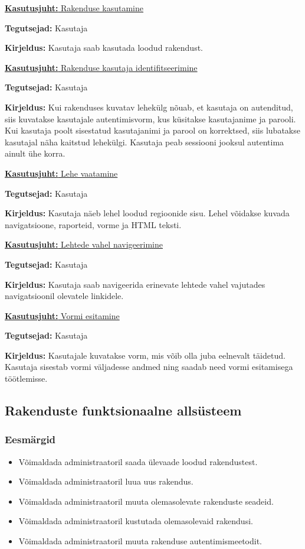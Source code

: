 \documentclass[a4paper,12pt]{article} %
\begin{document}
\underline{\textbf{Kasutusjuht:} Rakenduse kasutamine}
\par
\textbf{Tegutsejad:} Kasutaja
\par
\textbf{Kirjeldus:} Kasutaja saab kasutada loodud rakendust.
\par

\underline{\textbf{Kasutusjuht:} Rakenduse kasutaja identifitseerimine}
\par
\textbf{Tegutsejad:} Kasutaja
\par
\textbf{Kirjeldus:} Kui rakenduses kuvatav lehekülg nõuab, et kasutaja on autenditud, siis kuvatakse kasutajale autentimisvorm, kus küsitakse kasutajanime ja parooli. Kui kasutaja poolt sisestatud kasutajanimi ja parool on korrektsed, siis lubatakse kasutajal näha kaitstud lehekülgi. Kasutaja peab sessiooni jooksul autentima ainult ühe korra.
\par

\underline{\textbf{Kasutusjuht:} Lehe vaatamine}
\par
\textbf{Tegutsejad:} Kasutaja
\par
\textbf{Kirjeldus:} Kasutaja näeb lehel loodud regioonide sisu. Lehel võidakse kuvada navigatsioone, raporteid, vorme ja HTML teksti.
\par

\underline{\textbf{Kasutusjuht:} Lehtede vahel navigeerimine}
\par
\textbf{Tegutsejad:} Kasutaja
\par
\textbf{Kirjeldus:} Kasutaja saab navigeerida erinevate lehtede vahel vajutades navigatsioonil olevatele linkidele.
\par

\underline{\textbf{Kasutusjuht:} Vormi esitamine}
\par
\textbf{Tegutsejad:} Kasutaja
\par
\textbf{Kirjeldus:} Kasutajale kuvatakse vorm, mis võib olla juba eelnevalt täidetud. Kasutaja sisestab vormi väljadesse andmed ning saadab need vormi esitamisega töötlemisse.
\par

\subsection{Rakenduste funktsionaalne allsüsteem}
\subsubsection{Eesmärgid}
\begin{itemize}
\item Võimaldada administraatoril saada ülevaade loodud rakendustest.
\item Võimaldada administraatoril luua uus rakendus.
\item Võimaldada administraatoril muuta olemasolevate rakenduste seadeid.
\item Võimaldada administraatoril kustutada olemasolevaid rakendusi.
\item Võimaldada administraatoril muuta rakenduse autentimismeetodit.
\end{itemize}
\end{document}
